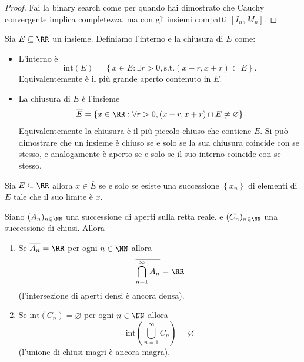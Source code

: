 \documentclass[11pt]{scrartcl}
\newcommand{\eset}{\varnothing}
\begin{document}
 	\begin{proof}
 		Fai la binary search come per quando hai dimostrato che Cauchy convergente implica completezza, ma con gli insiemi compatti $[I_n,M_n]$. 
 	\end{proof}
 	\begin{definition}
 		Sia $E\subseteq\RR$ un insieme. Definiamo l'interno e la chiusura di $E$ come:
 		\begin{itemize}
 			\item L'interno è 
 			$$\text{int}(E)=\left\{x\in E:\exists r>0,\text{s.t.} (x-r,x+r)\subset E\right\}.$$ 
 			Equivalentemente è il più grande aperto contenuto in $E$.
 			\item La chiusura di $E$ è l'insieme
 			$$\overline{E}=\left\{x\in\RR:\forall r>0,(x-r,x+r)\cap E\ne \eset\right\}$$
 			Equivalentemente la chiusura è il più piccolo chiuso che contiene $E$. Si può dimostrare che un insieme è chiuso se e solo se la sua chiusura coincide con se stesso, e analogamente è aperto se e solo se il suo interno coincide con se stesso.
 		\end{itemize}
 	\end{definition}
 	\begin{lemma}
 		Sia $E\subseteq\RR$ allora $x\in\overline{E}$ se e solo se esiste una successione $\left\{x_n\right\}$ di elementi di $E$ tale che il suo limite è $x$.
 	\end{lemma}
 	\begin{theorem}[Lemma di Ba{\"i}re]
 		Siano $(A_n)_{n\in\NN}$ una successione di aperti sulla retta reale. e $(C_n)_{n\in\NN}$ una successione di chiusi. Allora
 		\begin{enumerate}
 			\item[1)] Se $\overline{A_n}=\RR$ per ogni $n\in\NN$ allora
 			$$\overline{\bigcap_{n=1}^\infty A_n}=\RR$$
 			(l'intersezione di aperti densi è ancora densa).
 			\item[2)] Se $\text{int}(C_n)=\eset$ per ogni $n\in\NN$ allora
 			$$\text{int}\left(\bigcup_{n=1}^\infty C_n\right)=\eset$$
 			(l'unione di chiusi magri è ancora magra).
 		\end{enumerate}
 	\end{theorem}
\end{document}
